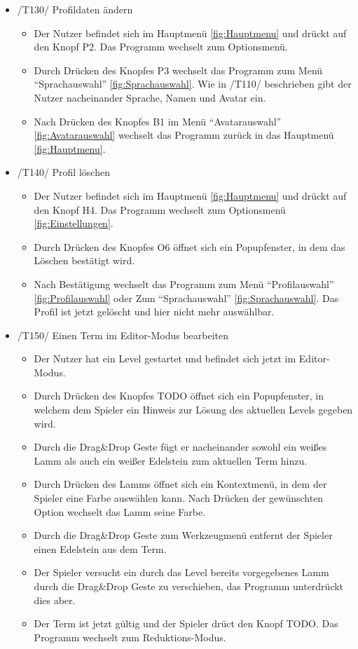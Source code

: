 \begin{itemize}
\item /T130/ Profildaten ändern
\begin{itemize}
\item Der Nutzer befindet sich im Hauptmenü \ref{fig:Hauptmenu} und drückt auf den Knopf P2. Das Programm wechselt zum Optionsmenü.
\item Durch Drücken des Knopfes P3 wechselt das Programm zum Menü "`Sprachauswahl"' \ref{fig:Sprachauswahl}. Wie in /T110/ beschrieben gibt der Nutzer nacheinander Sprache, Namen und Avatar ein.
\item Nach Drücken des Knopfes B1 im Menü "`Avatarauswahl"' \ref{fig:Avatarauswahl} wechselt das Programm zurück in das Hauptmenü \ref{fig:Hauptmenu}.
\end{itemize}

\item /T140/ Profil löschen
\begin{itemize}
\item Der Nutzer befindet sich im Hauptmenü \ref{fig:Hauptmenu} und drückt auf den Knopf H4. Das Programm wechselt zum Optionsmenü \ref{fig:Einstellungen}.
\item Durch Drücken des Knopfes O6 öffnet sich ein Popupfenster, in dem das Löschen bestätigt wird.
\item Nach Bestätigung wechselt das Programm zum Menü "`Profilauswahl"'
\ref{fig:Profilauswahl} oder Zum  "`Sprachauswahl"' \ref{fig:Sprachauswahl}. Das Profil ist jetzt gelöscht und hier nicht mehr auswählbar.
\end{itemize}

\item /T150/ Einen Term im Editor-Modus bearbeiten
\begin{itemize}
\item Der Nutzer hat ein Level gestartet und befindet sich jetzt im Editor-Modus.
\item Durch Drücken des Knopfes TODO öffnet sich ein Popupfenster, in welchem dem Spieler ein Hinweis zur Lösung des aktuellen Levels gegeben wird.
\item Durch die Drag\&Drop Geste fügt er nacheinander sowohl ein weißes Lamm als auch ein weißer Edelstein zum aktuellen Term hinzu.
\item Durch Drücken des Lamms öffnet sich ein Kontextmenü, in dem der Spieler eine Farbe auswählen kann. Nach Drücken der gewünschten Option wechselt das Lamm seine Farbe.
\item Durch die Drag\&Drop Geste zum Werkzeugmenü entfernt der Spieler einen Edelstein aus dem Term.
\item Der Spieler versucht ein durch das Level bereits vorgegebenes Lamm durch die Drag\&Drop Geste zu verschieben, das Programm unterdrückt dies aber.
\item Der Term ist jetzt gültig und der Spieler drüct den Knopf TODO. Das Programm wechselt zum Reduktions-Modus.
\end{itemize}


\end{itemize}
